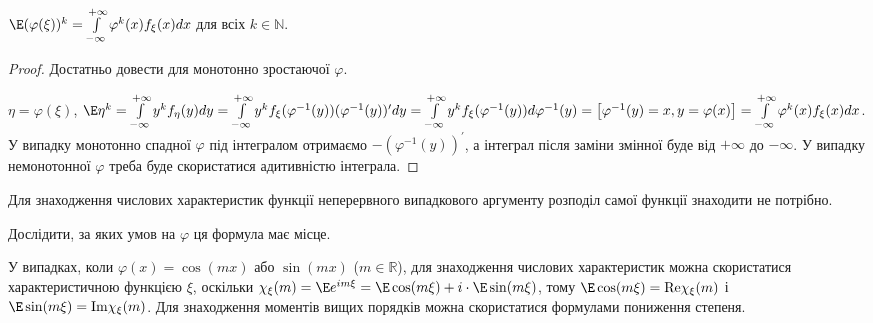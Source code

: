 \begin{proposition*}
    $\E (\varphi(\xi))^k = \int\limits_{-\infty}^{+\infty} \varphi^k(x) f_\xi(x) dx$ для всіх $k \in \mathbb{N}$.
\end{proposition*}
\begin{proof}
    Достатньо довести для монотонно зростаючої $\varphi$.

    \noindent$\eta = \varphi(\xi)$, $\E\eta^k = \int\limits_{-\infty}^{+\infty} y^k f_\eta(y) dy = \int\limits_{-\infty}^{+\infty} y^k f_\xi (\varphi^{-1} (y)) (\varphi^{-1} (y))^\prime dy =
    \int\limits_{-\infty}^{+\infty} y^k f_\xi(\varphi^{-1} (y)) d \varphi^{-1} (y) = \left[ \varphi^{-1} (y) = x, y = \varphi(x)\right] = \int\limits_{-\infty}^{+\infty} \varphi^k(x) f_\xi(x) dx$.
    У випадку монотонно спадної $\varphi$ під інтегралом отримаємо $-(\varphi^{-1} (y))^\prime$, а інтеграл після заміни змінної буде від $+\infty$ до $-\infty$.
    У випадку немонотонної $\varphi$ треба буде скористатися адитивністю інтеграла.
\end{proof}

\begin{remark}
    Для знаходження числових характеристик функції неперервного випадкового аргументу розподіл самої функції знаходити не потрібно.
\end{remark}

\begin{exercise}
    Дослідити, за яких умов на $\varphi$ ця формула має місце.
\end{exercise}

У випадках, коли $\varphi(x) = \cos (m x)$ або $\sin (m x)$ ($m\in \mathbb{R}$),
для знаходження числових характеристик можна скористатися характеристичною функцією $\xi$,
оскільки $\chi_{\xi}(m) = \E e^{i m \xi} = \E \cos(m\xi) + i \cdot\E\sin(m\xi)$,
тому $\E\cos(m\xi) = \mathrm{Re} \chi_{\xi}(m)$ і
$\E\sin(m\xi) = \mathrm{Im} \chi_{\xi}(m)$.
Для знаходження моментів вищих порядків можна скористатися формулами пониження степеня.